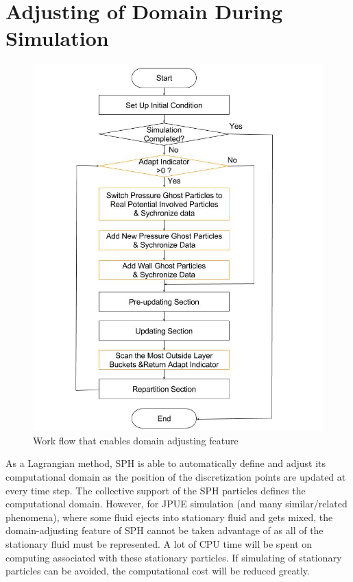 \documentclass[conference,compsoc]{IEEEtran}
\begin{document}
\section{Adjusting of Domain During Simulation}
\begin{figure}[!t]
\centering
\includegraphics[scale=0.32]{Work_flow_adjust}
\caption{Work flow that enables domain adjusting feature}
\label{fig:Work_flow_adjust}
\end{figure} 
As a Lagrangian method, SPH is able to automatically define and adjust its computational domain as the position of the discretization points are updated at every time step.  The 
collective support of the SPH particles defines the computational domain. However, for JPUE simulation (and many similar/related phenomena), where some fluid ejects into stationary fluid and gets mixed, the domain-adjusting feature of SPH cannot be taken advantage of as all of the stationary fluid must be represented.
A lot of CPU time will be spent on computing associated with these stationary particles.  If simulating of stationary particles can be avoided, the computational cost will be reduced greatly.
\end{document}
